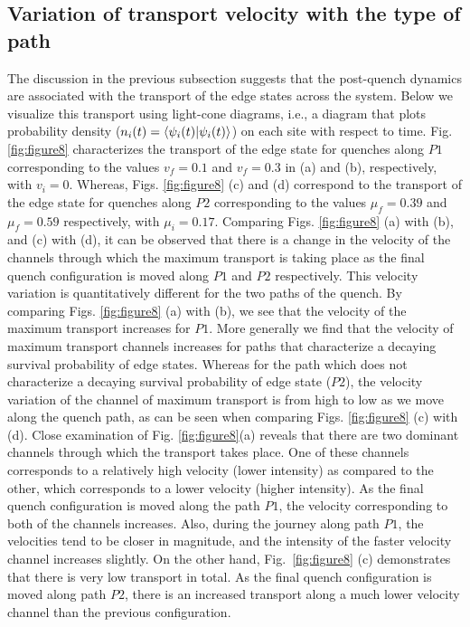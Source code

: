 \documentclass[aps,pra,reprint,superscriptaddress,longbibliography]{revtex4-2}
\begin{document}
\subsection{Variation of transport velocity with the type of path}
The discussion in the previous subsection suggests that the post-quench dynamics are associated with the transport of the edge states across the system. Below we visualize this transport using light-cone diagrams, i.e., a diagram that plots probability density ($n_i(t)= \bra{\psi_{i}(t)}\ket{\psi_{i}(t)} $) on each site with respect to time. Fig. \ref{fig:figure8} characterizes the transport of the edge state for quenches along $P1$ corresponding to the values $v_{f}=0.1$ and $v_{f}=0.3$ in (a) and (b), respectively, with $v_i=0$. Whereas, Figs. \ref{fig:figure8} (c) and (d) correspond to the transport of the edge state for quenches along $P2$ corresponding to the values $\mu_{f}=0.39$ and $\mu_{f}=0.59$ respectively, with $\mu_i=0.17$. Comparing Figs.  \ref{fig:figure8} (a) with (b),  and (c) with (d), it can be observed that there is a change in the velocity of the channels through which the maximum transport is taking place as the final quench configuration is moved along $P1$ and $P2$ respectively. This velocity variation is quantitatively different for the two paths of the quench. By comparing Figs.  \ref{fig:figure8} (a) with (b), we see that the velocity of the maximum transport increases for $P1$. More generally we find that the velocity of maximum transport channels increases for paths that characterize a decaying survival probability of edge states. Whereas for the path which does not characterize a decaying survival probability of edge state ($P2$), the velocity variation of the channel of maximum transport is from high to low as we move along the quench path, as can be seen when comparing Figs.  \ref{fig:figure8} (c) with (d). Close examination of Fig. \ref{fig:figure8}(a) reveals that there are two dominant channels through which the transport takes place. One of these channels corresponds to a relatively high velocity (lower intensity) as compared to the other, which corresponds to a lower velocity (higher intensity). As the final quench configuration is moved along the path $P1$, the velocity corresponding to both of the channels increases. Also, during the journey along path $P1$, the velocities tend to be closer in magnitude, and the intensity of the faster velocity channel increases slightly. On the other hand, Fig.~\ref{fig:figure8} (c) demonstrates that there is very low transport in total. As the final quench configuration is moved along path $P2$, there is an increased transport along a much lower velocity channel than the previous configuration.
 
\end{document}
